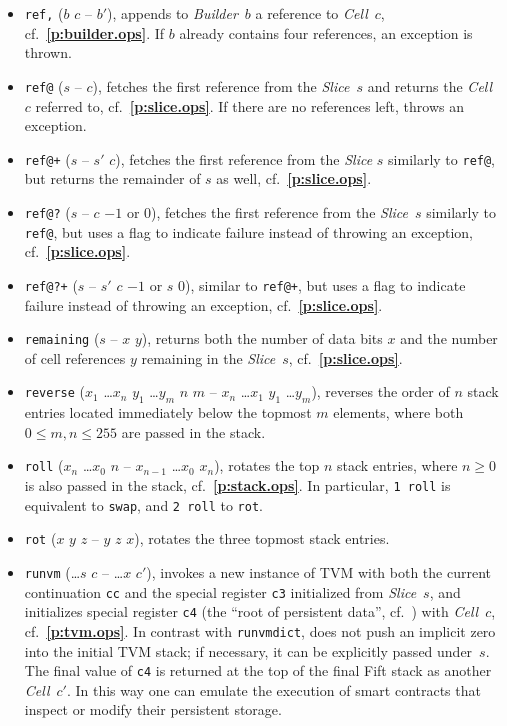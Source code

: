 \documentclass[12pt,oneside]{article}
\def\refpoint#1{{\rm\textbf{\ref{#1}}}}
\let\ptref=\refpoint
\begin{document}
\begin{itemize}
\item {\tt ref,} ($b$ $c$ -- $b'$), appends to {\em Builder\/}~$b$ a reference to {\em Cell\/}~$c$, cf.~\ptref{p:builder.ops}. If $b$ already contains four references, an exception is thrown.
\item {\tt ref@} ($s$ -- $c$), fetches the first reference from the {\em Slice\/}~$s$ and returns the {\em Cell}~$c$ referred to, cf.~\ptref{p:slice.ops}. If there are no references left, throws an exception.
\item {\tt ref@+} ($s$ -- $s'$ $c$), fetches the first reference from the {\em Slice\/} $s$ similarly to {\tt ref@}, but returns the remainder of $s$ as well, cf.~\ptref{p:slice.ops}.
\item {\tt ref@?} ($s$ -- $c$ $-1$ or $0$), fetches the first reference from the {\em Slice}~$s$ similarly to {\tt ref@}, but uses a flag to indicate failure instead of throwing an exception, cf.~\ptref{p:slice.ops}.
\item {\tt ref@?+} ($s$ -- $s'$ $c$ $-1$ or $s$ $0$), similar to {\tt ref@+}, but uses a flag to indicate failure instead of throwing an exception, cf.~\ptref{p:slice.ops}.
\item {\tt remaining} ($s$ -- $x$ $y$), returns both the number of data bits $x$ and the number of cell references $y$ remaining in the {\em Slice}~$s$, cf.~\ptref{p:slice.ops}.
\item {\tt reverse} ($x_1$ \dots $x_n$ $y_1$ \dots $y_m$ $n$ $m$ -- $x_n$ \dots $x_1$ $y_1$ \dots $y_m$), reverses the order of $n$ stack entries located immediately below the topmost $m$ elements, where both $0\leq m,n\leq 255$ are passed in the stack.
\item {\tt roll} ($x_n$ \dots $x_0$ $n$ -- $x_{n-1}$ \dots $x_0$ $x_n$), rotates the top $n$ stack entries, where $n\geq0$ is also passed in the stack, cf.~\ptref{p:stack.ops}. In particular, {\tt 1 roll} is equivalent to {\tt swap}, and {\tt 2 roll} to {\tt rot}.
\item {\tt rot} ($x$ $y$ $z$ -- $y$ $z$ $x$), rotates the three topmost stack entries.
\item {\tt runvm} (\dots $s$ $c$ -- \dots $x$ $c'$), invokes a new instance of TVM with both the current continuation {\tt cc} and the special register {\tt c3} initialized from {\em Slice\/}~$s$, and initializes special register {\tt c4} (the ``root of persistent data'', cf.~\cite[1.4]{TVM}) with {\em Cell\/}~$c$, cf.~\ptref{p:tvm.ops}. In contrast with {\tt runvmdict}, does not push an implicit zero into the initial TVM stack; if necessary, it can be explicitly passed under~$s$. The final value of {\tt c4} is returned at the top of the final Fift stack as another {\em Cell\/}~$c'$. In this way one can emulate the execution of smart contracts that inspect or modify their persistent storage.

\end{itemize}
\end{document}
